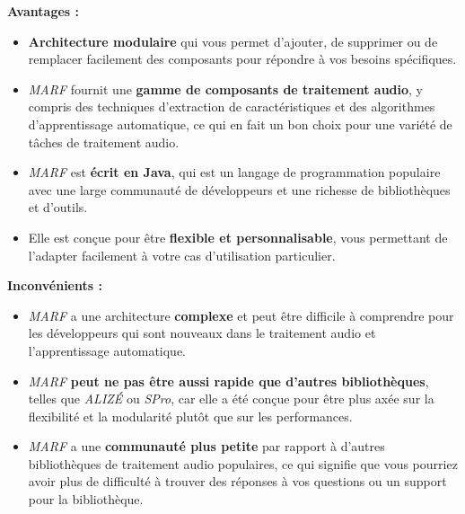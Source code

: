 \begin{itemize}
            \textbf{Avantages :}
            \begin{itemize}
                  \item \textbf{Architecture modulaire} qui vous permet d'ajouter, de supprimer ou de remplacer facilement des composants
                        pour répondre à vos besoins spécifiques.
                  \item \textit{MARF} fournit une  \textbf{gamme de composants de traitement audio}, y compris des techniques d'extraction de caractéristiques
                        et des algorithmes d'apprentissage automatique, ce qui en fait un bon choix pour une variété de tâches de traitement audio.
                  \item  \textit{MARF} est \textbf{écrit en Java}, qui est un langage de programmation populaire avec une large communauté de développeurs et
                        une richesse de bibliothèques et d'outils.
                  \item Elle est conçue pour être \textbf{flexible et personnalisable}, vous permettant de l'adapter facilement à votre cas d'utilisation
                        particulier.
            \end{itemize}


            \textbf{Inconvénients :}
            \begin{itemize}
                  \item \textit{MARF} a une architecture \textbf{complexe} et peut être difficile à comprendre pour les développeurs qui sont nouveaux dans le
                        traitement audio et l'apprentissage automatique.
                  \item  \textit{MARF} \textbf{peut ne pas être aussi rapide que d'autres bibliothèques}, telles que \textit{ALIZÉ} ou \textit{SPro}, car elle
                        a été conçue pour être plus axée sur la flexibilité et la modularité plutôt que sur les performances.
                  \item \textit{MARF} a une \textbf{communauté plus petite} par rapport à d'autres bibliothèques de traitement audio
                        populaires, ce qui signifie que vous pourriez avoir plus de difficulté à trouver des réponses à vos questions ou un support pour la
                        bibliothèque.
            \end{itemize}

\end{itemize}
